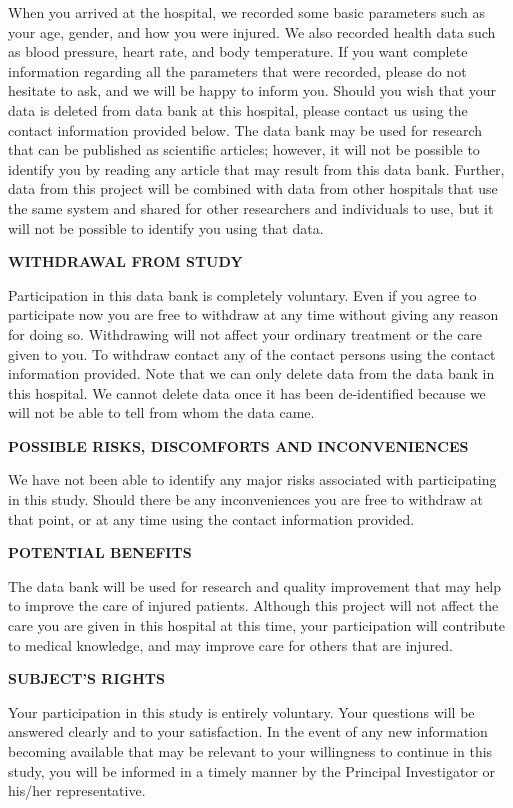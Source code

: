 When you arrived at the hospital, we recorded some basic parameters such
as your age, gender, and how you were injured. We also recorded health
data such as blood pressure, heart rate, and body temperature. If you
want complete information regarding all the parameters that were
recorded, please do not hesitate to ask, and we will be happy to inform
you. Should you wish that your data is deleted from data bank at this
hospital, please contact us using the contact information provided
below. The data bank may be used for research that can be published as
scientific articles; however, it will not be possible to identify you by
reading any article that may result from this data bank. Further, data
from this project will be combined with data from other hospitals that
use the same system and shared for other researchers and individuals to
use, but it will not be possible to identify you using that data.

\textbf{WITHDRAWAL FROM STUDY}

Participation in this data bank is completely voluntary. Even if you
agree to participate now you are free to withdraw at any time without
giving any reason for doing so. Withdrawing will not affect your
ordinary treatment or the care given to you. To withdraw contact any of
the contact persons using the contact information provided. Note that we
can only delete data from the data bank in this hospital. We cannot
delete data once it has been de-identified because we will not be able
to tell from whom the data came.

\textbf{POSSIBLE RISKS, DISCOMFORTS AND INCONVENIENCES}

We have not been able to identify any major risks associated with
participating in this study. Should there be any inconveniences you are
free to withdraw at that point, or at any time using the contact
information provided.

\textbf{POTENTIAL BENEFITS}

The data bank will be used for research and quality improvement that may
help to improve the care of injured patients. Although this project will
not affect the care you are given in this hospital at this time, your
participation will contribute to medical knowledge, and may improve care
for others that are injured.

\textbf{SUBJECT'S RIGHTS}

Your participation in this study is entirely voluntary. Your questions
will be answered clearly and to your satisfaction. In the event of any
new information becoming available that may be relevant to your
willingness to continue in this study, you will be informed in a timely
manner by the Principal Investigator or his/her representative.

